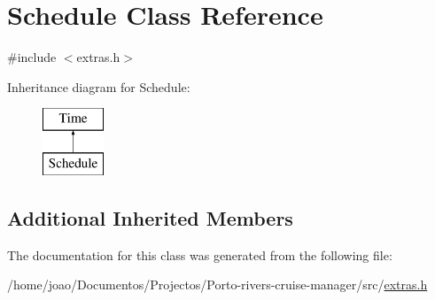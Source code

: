 \hypertarget{classSchedule}{}\section{Schedule Class Reference}
\label{classSchedule}


{\ttfamily \#include $<$extras.\+h$>$}

Inheritance diagram for Schedule\+:\begin{figure}[H]
\begin{center}
\leavevmode
\includegraphics[height=2.000000cm]{classSchedule}
\end{center}
\end{figure}
\subsection*{Additional Inherited Members}


The documentation for this class was generated from the following file\+:\begin{DoxyCompactItemize}
\item 
/home/joao/\+Documentos/\+Projectos/\+Porto-\/rivers-\/cruise-\/manager/src/\hyperlink{extras_8h}{extras.\+h}\end{DoxyCompactItemize}
